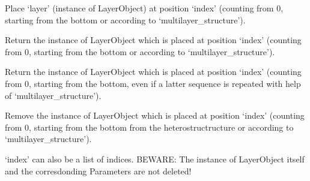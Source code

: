 \documentclass[letterpaper,10pt,english]{sphinxmanual}
\begin{document}
\begin{fulllineitems}
\begin{fulllineitems}
\label{\detokenize{modules-api/samplerepresentation:SampleRepresentation.Heterostructure.setLayer}}
Place ‘layer’ (instance of LayerObject) at position ‘index’ (counting from 0, starting from the bottom or according to ‘multilayer\_structure’).

\end{fulllineitems}


\begin{fulllineitems}
\label{\detokenize{modules-api/samplerepresentation:SampleRepresentation.Heterostructure.getLayer}}
Return the instance of LayerObject which is placed at position ‘index’ (counting from 0, starting from the bottom or according to ‘multilayer\_structure’).

\end{fulllineitems}


\begin{fulllineitems}
\label{\detokenize{modules-api/samplerepresentation:SampleRepresentation.Heterostructure.getTotalLayer}}
Return the instance of LayerObject which is placed at position ‘index’ (counting from 0, starting from the bottom, even if a latter sequence is repeated with help of ‘multilayer\_structure’).

\end{fulllineitems}


\begin{fulllineitems}
\label{\detokenize{modules-api/samplerepresentation:SampleRepresentation.Heterostructure.removeLayer}}
Remove the instance of LayerObject which is placed at position ‘index’ (counting from 0, starting from the bottom from the  heterostructructure or according to ‘multilayer\_structure’).

‘index’ can also be a list of indices.
BEWARE: The instance of LayerObject itself and the corresdonding Parameters are not deleted!


\end{fulllineitems}
\end{fulllineitems}
\end{document}
